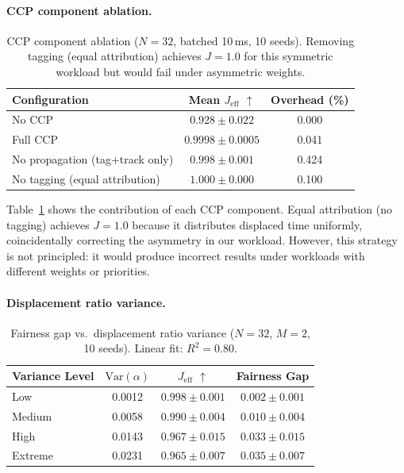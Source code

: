 \documentclass{article}
\newcommand{\displacement}{\alpha}
\newcommand{\jeff}{J_{\mathrm{eff}}}
\begin{document}
\paragraph{CCP component ablation.}

\begin{table}[t]
\caption{CCP component ablation ($N = 32$, batched 10\,ms, 10 seeds). Removing tagging (equal attribution) achieves $J = 1.0$ for this symmetric workload but would fail under asymmetric weights.}
\label{tab:ablation_ccp}
\centering
\begin{tabular}{lcc}
\toprule
Configuration & Mean $\jeff$ $\uparrow$ & Overhead (\%) \\
\midrule
No CCP & $0.928 \pm 0.022$ & 0.000 \\
Full CCP & $\mathbf{0.9998 \pm 0.0005}$ & 0.041 \\
No propagation (tag+track only) & $0.998 \pm 0.001$ & 0.424 \\
No tagging (equal attribution) & $1.000 \pm 0.000$ & 0.100 \\
\bottomrule
\end{tabular}
\end{table}

Table~\ref{tab:ablation_ccp} shows the contribution of each CCP component. Equal attribution (no tagging) achieves $J = 1.0$ because it distributes displaced time uniformly, coincidentally correcting the asymmetry in our workload. However, this strategy is not principled: it would produce incorrect results under workloads with different weights or priorities.

\paragraph{Displacement ratio variance.}
\label{sec:sensitivity}

\begin{table}[t]
\caption{Fairness gap vs.\ displacement ratio variance ($N = 32$, $M = 2$, 10 seeds). Linear fit: $R^2 = 0.80$.}
\label{tab:ablation_var}
\centering
\begin{tabular}{lccc}
\toprule
Variance Level & $\mathrm{Var}(\displacement)$ & $\jeff$ $\uparrow$ & Fairness Gap \\
\midrule
Low & 0.0012 & $0.998 \pm 0.001$ & $0.002 \pm 0.001$ \\
Medium & 0.0058 & $0.990 \pm 0.004$ & $0.010 \pm 0.004$ \\
High & 0.0143 & $0.967 \pm 0.015$ & $0.033 \pm 0.015$ \\
Extreme & 0.0231 & $0.965 \pm 0.007$ & $0.035 \pm 0.007$ \\
\bottomrule
\end{tabular}
\end{table}
\end{document}
